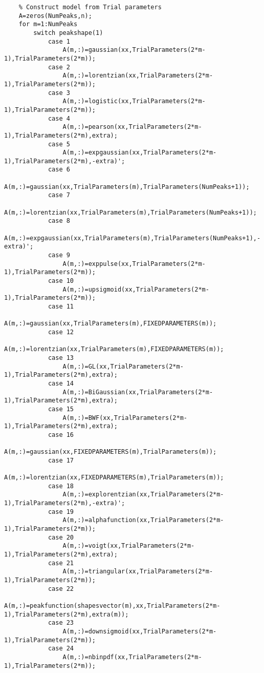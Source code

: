\begin{lstlisting}
    % Construct model from Trial parameters
    A=zeros(NumPeaks,n);
    for m=1:NumPeaks
        switch peakshape(1)
            case 1
                A(m,:)=gaussian(xx,TrialParameters(2*m-1),TrialParameters(2*m));
            case 2
                A(m,:)=lorentzian(xx,TrialParameters(2*m-1),TrialParameters(2*m));
            case 3
                A(m,:)=logistic(xx,TrialParameters(2*m-1),TrialParameters(2*m));
            case 4
                A(m,:)=pearson(xx,TrialParameters(2*m-1),TrialParameters(2*m),extra);
            case 5
                A(m,:)=expgaussian(xx,TrialParameters(2*m-1),TrialParameters(2*m),-extra)';
            case 6
                A(m,:)=gaussian(xx,TrialParameters(m),TrialParameters(NumPeaks+1));
            case 7
                A(m,:)=lorentzian(xx,TrialParameters(m),TrialParameters(NumPeaks+1));
            case 8
                A(m,:)=expgaussian(xx,TrialParameters(m),TrialParameters(NumPeaks+1),-extra)';
            case 9
                A(m,:)=exppulse(xx,TrialParameters(2*m-1),TrialParameters(2*m));
            case 10
                A(m,:)=upsigmoid(xx,TrialParameters(2*m-1),TrialParameters(2*m));
            case 11
                A(m,:)=gaussian(xx,TrialParameters(m),FIXEDPARAMETERS(m));
            case 12
                A(m,:)=lorentzian(xx,TrialParameters(m),FIXEDPARAMETERS(m));
            case 13
                A(m,:)=GL(xx,TrialParameters(2*m-1),TrialParameters(2*m),extra);
            case 14
                A(m,:)=BiGaussian(xx,TrialParameters(2*m-1),TrialParameters(2*m),extra);
            case 15
                A(m,:)=BWF(xx,TrialParameters(2*m-1),TrialParameters(2*m),extra);
            case 16
                A(m,:)=gaussian(xx,FIXEDPARAMETERS(m),TrialParameters(m));
            case 17
                A(m,:)=lorentzian(xx,FIXEDPARAMETERS(m),TrialParameters(m));
            case 18
                A(m,:)=explorentzian(xx,TrialParameters(2*m-1),TrialParameters(2*m),-extra)';
            case 19
                A(m,:)=alphafunction(xx,TrialParameters(2*m-1),TrialParameters(2*m));
            case 20
                A(m,:)=voigt(xx,TrialParameters(2*m-1),TrialParameters(2*m),extra);
            case 21
                A(m,:)=triangular(xx,TrialParameters(2*m-1),TrialParameters(2*m));
            case 22
                A(m,:)=peakfunction(shapesvector(m),xx,TrialParameters(2*m-1),TrialParameters(2*m),extra(m));
            case 23
                A(m,:)=downsigmoid(xx,TrialParameters(2*m-1),TrialParameters(2*m));      
            case 24
                A(m,:)=nbinpdf(xx,TrialParameters(2*m-1),TrialParameters(2*m));

\end{lstlisting}
